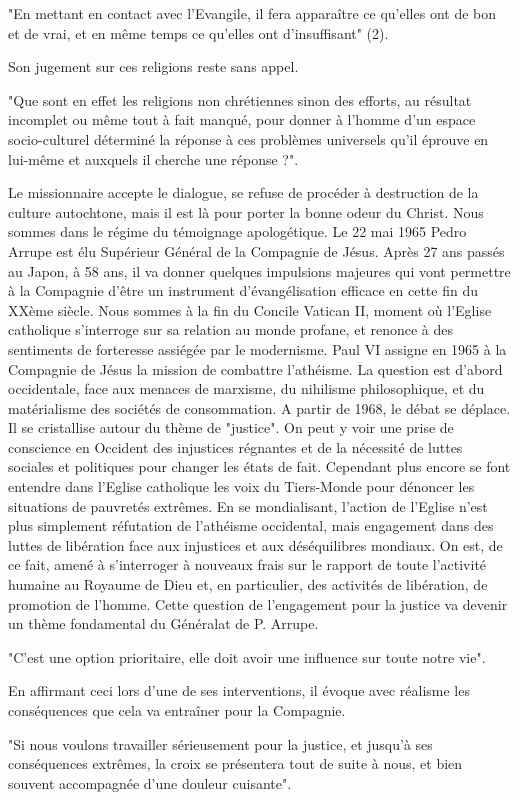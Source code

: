 \begin{singlequote}
    "En mettant en contact
avec l'Evangile, il fera apparaître ce qu'elles ont de bon et de vrai, et en même temps ce
qu'elles ont d'insuffisant" (2).
\end{singlequote} 
Son jugement sur ces religions reste sans appel. 
\begin{singlequote}
    "Que sont
en effet les religions non chrétiennes sinon des efforts, au résultat incomplet ou même
tout à fait manqué, pour donner à l'homme d'un espace socio-culturel déterminé la
réponse à ces problèmes universels qu'il éprouve en lui-même et auxquels il cherche une
réponse ?".
\end{singlequote}
 Le missionnaire accepte le dialogue, se refuse de procéder à destruction de la
culture autochtone, mais il est là pour porter la bonne odeur du Christ. Nous sommes
dans le régime du témoignage apologétique.
Le 22 mai 1965 Pedro Arrupe est élu Supérieur Général de la Compagnie de
Jésus. Après 27 ans passés au Japon, à 58 ans, il va donner quelques impulsions
majeures qui vont permettre à la Compagnie d'être un instrument d'évangélisation
efficace en cette fin du XXème siècle. Nous sommes à la fin du Concile Vatican II,
moment où l'Eglise catholique s'interroge sur sa relation au monde profane, et renonce à
des sentiments de forteresse assiégée par le modernisme. Paul VI assigne en 1965 à la
Compagnie de Jésus la mission de combattre l'athéisme. La question est d'abord
occidentale, face aux menaces de marxisme, du nihilisme philosophique, et du
matérialisme des sociétés de consommation. A partir de 1968, le débat se déplace. Il se
cristallise autour du thème de "justice". On peut y voir une prise de conscience en
Occident des injustices régnantes et de la nécessité de luttes sociales et politiques pour
changer les états de fait. Cependant plus encore se font entendre dans l'Eglise catholique
les voix du Tiers-Monde pour dénoncer les situations de pauvretés extrêmes. En se
mondialisant, l'action de l'Eglise n'est plus simplement réfutation de l'athéisme
occidental, mais engagement dans des luttes de libération face aux injustices et aux
déséquilibres mondiaux. On est, de ce fait, amené à s'interroger à nouveaux frais sur le
rapport de toute l'activité humaine au Royaume de Dieu et, en particulier, des activités de
libération, de promotion de l'homme. Cette question de l'engagement pour la justice va
devenir un thème fondamental du Généralat de P. Arrupe. \begin{singlequote}
    "C'est une option prioritaire,
elle doit avoir une influence sur toute notre vie".
\end{singlequote} En affirmant ceci lors d'une de ses
interventions, il évoque avec réalisme les conséquences que cela va entraîner pour la
Compagnie. 
\begin{singlequote}
    "Si nous voulons travailler sérieusement pour la justice, et jusqu'à ses
conséquences extrêmes, la croix se présentera tout de suite à nous, et bien souvent
accompagnée d'une douleur cuisante". 
\end{singlequote}

